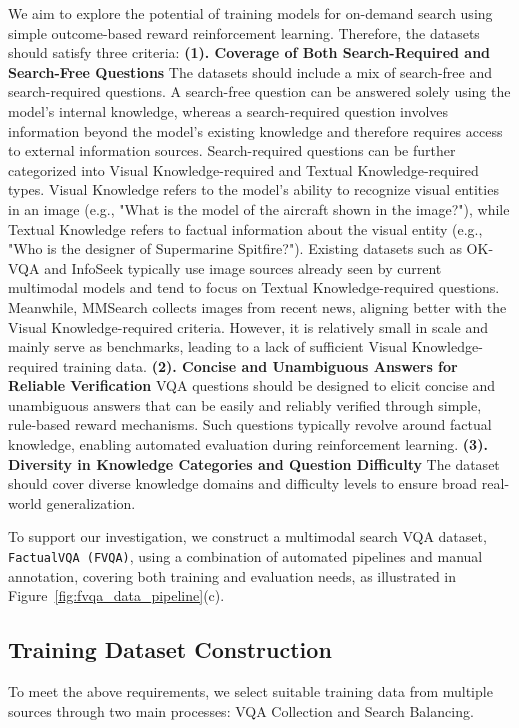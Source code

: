 \documentclass{article}
\begin{document}
We aim to explore the potential of training models for on-demand search using simple outcome-based reward reinforcement learning. Therefore, the datasets should satisfy three criteria: \textbf{(1). Coverage of Both Search-Required and Search-Free Questions} The datasets should include a mix of search-free and search-required questions. A search-free question can be answered solely using the model’s internal knowledge, whereas a search-required question involves information beyond the model’s existing knowledge and therefore requires access to external information sources. Search-required questions can be further categorized into Visual Knowledge-required and Textual Knowledge-required types. Visual Knowledge refers to the model’s ability to recognize visual entities in an image (e.g., "What is the model of the aircraft shown in the image?"), while Textual Knowledge refers to factual information about the visual entity (e.g., "Who is the designer of Supermarine Spitfire?"). Existing datasets such as OK-VQA \cite{dataset/ok-vqa} and InfoSeek \cite{dataset/infoseek} typically use image sources already seen by current multimodal models and tend to focus on Textual Knowledge-required questions. Meanwhile, MMSearch \cite{vision-rag/mmsearch} collects images from recent news, aligning better with the Visual Knowledge-required criteria. However, it is relatively small in scale and mainly serve as benchmarks, leading to a lack of sufficient Visual Knowledge-required training data. \textbf{(2). Concise and Unambiguous Answers for Reliable Verification} VQA questions should be designed to elicit concise and unambiguous answers that can be easily and reliably verified through simple, rule-based reward mechanisms. Such questions typically revolve around factual knowledge, enabling automated evaluation during reinforcement learning. \textbf{(3). Diversity in Knowledge Categories and Question Difficulty} The dataset should cover diverse knowledge domains and difficulty levels to ensure broad real-world generalization. 

To support our investigation, we construct a multimodal search VQA dataset, \texttt{FactualVQA (FVQA)}, using a combination of automated pipelines and manual annotation, covering both training and evaluation needs, as illustrated in Figure~\ref{fig:fvqa_data_pipeline}(c).

\subsection{Training Dataset Construction}
To meet the above requirements, we select suitable training data from multiple sources through two main processes: VQA Collection and Search Balancing.
\end{document}
